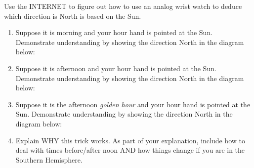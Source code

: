 \documentclass[noauthor,nooutcomes,handout,hints]{ximera}
\begin{document}
\mynewpage




\begin{question}
  Use the INTERNET to figure out how to use an analog wrist watch to
  deduce which direction is North is based on the Sun. 
  \begin{enumerate}
  \item Suppose it is morning and your hour hand is pointed at the
    Sun.  Demonstrate understanding by showing the direction North in
    the diagram below:
    \begin{center}
    \end{center}
     \item Suppose it is afternoon and your hour hand is pointed at
       the Sun. Demonstrate understanding by showing the direction
       North in the diagram below:
    \begin{center}
    \end{center}
  \item Suppose it is the afternoon \textit{golden hour} and your hour
    hand is pointed at the Sun. Demonstrate understanding by showing
    the direction North in the diagram below:
    \begin{center}
    \end{center}
  \item Explain WHY this trick works. As part of your explanation,
    include how to deal with times before/after noon AND how things
    change if you are in the Southern Hemisphere.
  \end{enumerate}




  
\end{question}
\end{document}
